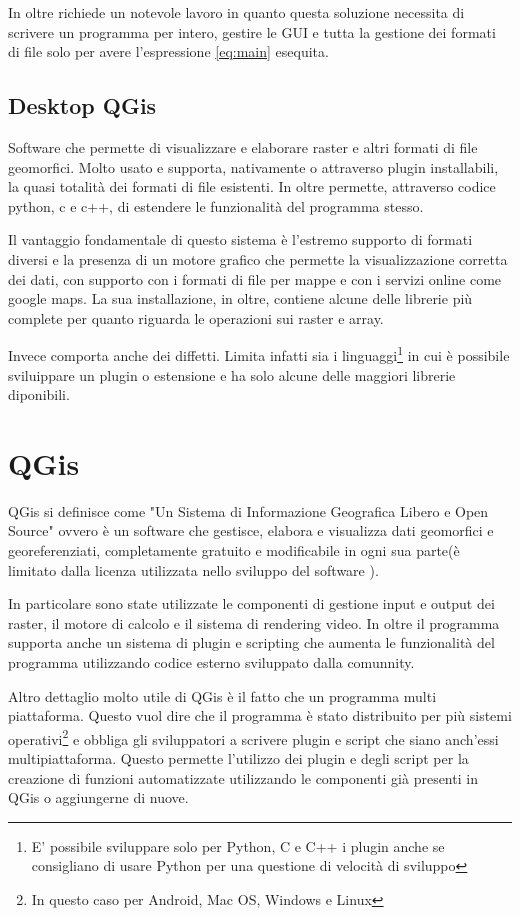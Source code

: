 In oltre richiede un notevole lavoro in quanto questa soluzione necessita di scrivere un programma per intero, gestire le GUI e tutta la gestione dei formati di file solo per avere l'espressione \ref{eq:main} esequita.

\subsection{Desktop QGis}

Software che permette di visualizzare e elaborare raster e altri formati di file geomorfici. Molto usato e supporta, nativamente o attraverso plugin installabili, la quasi totalità dei formati di file esistenti. In oltre permette, attraverso codice python, c e c++, di estendere le funzionalità del programma stesso.

Il vantaggio fondamentale di questo sistema è l'estremo supporto di formati diversi e la presenza di un motore grafico che permette la visualizzazione corretta dei dati, con supporto con i formati di file per mappe e con i servizi online come google maps. La sua installazione, in oltre, contiene alcune delle librerie più complete per quanto riguarda le operazioni sui raster e array.

Invece comporta anche dei diffetti. Limita infatti sia i linguaggi\footnote{E' possibile sviluppare solo per Python, C e C++ i plugin anche se consigliano di usare Python per una questione di velocità di sviluppo} in cui è possibile sviluippare un plugin o estensione e ha solo alcune delle maggiori librerie diponibili.

\section{QGis}

QGis si definisce come "Un Sistema di Informazione Geografica Libero e Open Source"\cite{site:qgis} ovvero è un software che gestisce, elabora e visualizza dati geomorfici e georeferenziati, completamente gratuito e modificabile in ogni sua parte(è limitato dalla licenza utilizzata nello sviluppo del software \cite{site:cc3}).

In particolare sono state utilizzate le componenti di gestione input e output dei raster, il motore di calcolo e il sistema di rendering video. In oltre il programma supporta anche un sistema di plugin e scripting che aumenta le funzionalità del programma utilizzando codice esterno sviluppato dalla comunnity.

Altro dettaglio molto utile di QGis è il fatto che un programma multi piattaforma. Questo vuol dire che il programma è stato distribuito per più sistemi operativi\footnote{In questo caso per Android, Mac OS, Windows e Linux} e obbliga gli sviluppatori a scrivere plugin e script che siano anch'essi multipiattaforma. Questo permette l'utilizzo dei plugin e degli script per la creazione di funzioni automatizzate utilizzando le componenti già presenti in QGis o aggiungerne di nuove.

